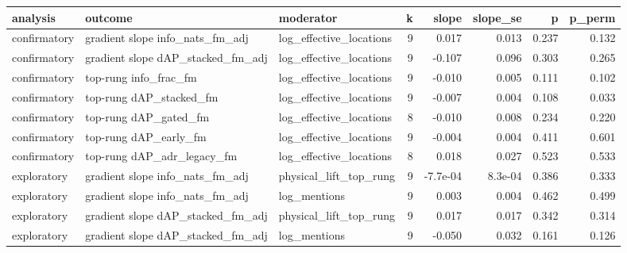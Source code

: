 \begin{tabular}{lllrrrrr}
\toprule
analysis & outcome & moderator & k & slope & slope_se & p & p_perm \\
\midrule
confirmatory & gradient slope info\_nats\_fm\_adj & log\_effective\_locations & 9 & 0.017 & 0.013 & 0.237 & 0.132 \\
confirmatory & gradient slope dAP\_stacked\_fm\_adj & log\_effective\_locations & 9 & -0.107 & 0.096 & 0.303 & 0.265 \\
confirmatory & top-rung info\_frac\_fm & log\_effective\_locations & 9 & -0.010 & 0.005 & 0.111 & 0.102 \\
confirmatory & top-rung dAP\_stacked\_fm & log\_effective\_locations & 9 & -0.007 & 0.004 & 0.108 & 0.033 \\
confirmatory & top-rung dAP\_gated\_fm & log\_effective\_locations & 8 & -0.010 & 0.008 & 0.234 & 0.220 \\
confirmatory & top-rung dAP\_early\_fm & log\_effective\_locations & 9 & -0.004 & 0.004 & 0.411 & 0.601 \\
confirmatory & top-rung dAP\_adr\_legacy\_fm & log\_effective\_locations & 8 & 0.018 & 0.027 & 0.523 & 0.533 \\
exploratory & gradient slope info\_nats\_fm\_adj & physical\_lift\_top\_rung & 9 & -7.7e-04 & 8.3e-04 & 0.386 & 0.333 \\
exploratory & gradient slope info\_nats\_fm\_adj & log\_mentions & 9 & 0.003 & 0.004 & 0.462 & 0.499 \\
exploratory & gradient slope dAP\_stacked\_fm\_adj & physical\_lift\_top\_rung & 9 & 0.017 & 0.017 & 0.342 & 0.314 \\
exploratory & gradient slope dAP\_stacked\_fm\_adj & log\_mentions & 9 & -0.050 & 0.032 & 0.161 & 0.126 \\
\bottomrule
\end{tabular}
